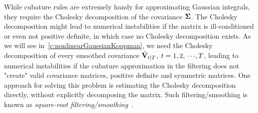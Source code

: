 		While cubature rules are extremely handy for approximating Gaussian integrals, they require the Cholesky decomposition of the covariance \( \boldsymbol{\mathrm{\Sigma}} \). The Cholesky decomposition might lead to numerical instabilities if the matrix is ill-conditioned or even not positive definite, in which case no Cholesky decomposition exists. As we will see in~\autoref{c:nonlinearGaussianKoopman}, we need the Cholesky decomposition of every smoothed covariance \( \hat{\boldsymbol{\mathrm{V}}}_{t \vert T} \), \( t = 1, 2, \,\cdots\!, T \), leading to numerical instabilities if the cubature approximation in the filtering does not "create" valid covariance matrices, \ie positive definite and symmetric matrices. One approach for solving this problem is estimating the Cholesky decomposition directly, without explicitly decomposing the matrix. Such filtering/smoothing is known as \emph{square-root filtering/smoothing}~\cite{vandermerweSquarerootUnscentedKalman2001,ruttenSquarerootUnscentedFiltering2013}.

